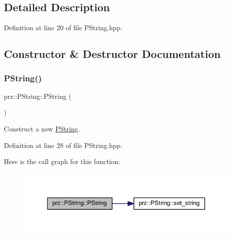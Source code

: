 \subsection{Detailed Description}


Definition at line 20 of file P\+String.\+hpp.



\subsection{Constructor \& Destructor Documentation}
\mbox{\label{classprz_1_1_p_string_a49c184bdacf058b300fbcbb2f1dabb73}} 
\subsubsection{\texorpdfstring{PString()}{PString()}\hspace{0.1cm}{\footnotesize\ttfamily [1/3]}}
{\footnotesize\ttfamily prz\+::\+P\+String\+::\+P\+String (\begin{DoxyParamCaption}{ }\end{DoxyParamCaption})\hspace{0.3cm}{\ttfamily [inline]}}



Construct a new \mbox{\hyperlink{classprz_1_1_p_string}{P\+String}}. 



Definition at line 28 of file P\+String.\+hpp.

Here is the call graph for this function\+:
\nopagebreak
\begin{figure}[H]
\begin{center}
\leavevmode
\includegraphics[width=340pt]{classprz_1_1_p_string_a49c184bdacf058b300fbcbb2f1dabb73_cgraph}
\end{center}
\end{figure}
\mbox{\label{classprz_1_1_p_string_a49564845487998ce0fe4062df21dd857}} 
